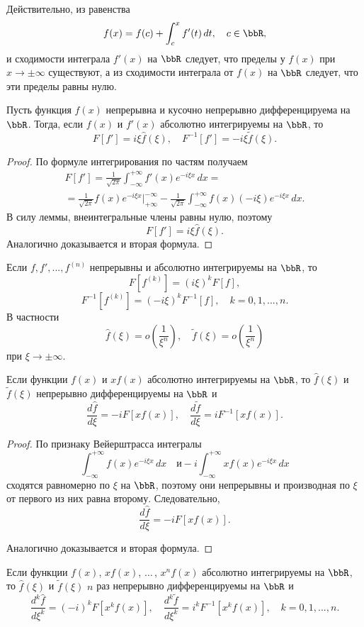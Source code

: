 Действительно, из равенства
$$
f(x)=f(c)+\int_c^x f'(t)\,dt,\quad c\in\bbR,
$$
и сходимости интеграла $f'(x)$ на $\bbR$ следует, что пределы у $f(x)$ при $x\to\pm\infty$ существуют, а из сходимости интеграла от $f(x)$ на $\bbR$ следует, что эти пределы равны нулю.

\begin{thm}
Пусть функция $f(x)$ непрерывна и кусочно непрерывно дифференцируема на $\bbR$. Тогда, если $f(x)$ и $f'(x)$ абсолютно интегрируемы на $\bbR$, то
$$
F[f']=i\xi\widehat{f}(\xi),\quad F^{-1}[f']=-i\xi \widetilde{f}(\xi).
$$
\end{thm}

\begin{proof}
По формуле интегрирования по частям получаем
\begin{multline*}
F[f']=\frac{1}{\sqrt{2\pi}}\int_{-\infty}^{+\infty} f'(x)e^{-i\xi x}\,dx=\\
={\frac{1}{\sqrt{2\pi}}f(x)e^{-i\xi x}}	
\bigg|^{-\infty}_{+\infty} - \frac{1}{\sqrt{2\pi}}\int_{-\infty}^{+\infty}f(x)(-i\xi)e^{-i\xi x}\,dx.
\end{multline*}
В силу леммы, внеинтегральные члены равны нулю, поэтому
$$
F[f']=i\xi\widehat{f}(\xi).
$$
Аналогично доказывается и вторая формула.
\end{proof}

\begin{cons}
Если $f,f',...,f^{(n)}$ непрерывны и абсолютно интегрируемы на $\bbR$, то
$$
F[f^{(k)}]=(i\xi)^kF[f],
$$
$$
F^{-1}[f^{(k)}]=(-i\xi)^kF^{-1}[f], \quad k=0,1,...,n.
$$
В частности
$$
\widehat{f}(\xi)=o\left(\frac{1}{\xi^n}\right),\quad \widetilde{f}(\xi)=o\left(\frac{1}{\xi^n}\right)
$$
при $\xi\to\pm\infty$.
\end{cons}

\begin{thm}
Если функции $f(x)$ и  $xf(x)$ абсолютно интегрируемы на $\bbR$, то $\widehat{f}(\xi)$ и $\widetilde{f}(\xi)$ непрерывно дифференцируемы на $\bbR$ и 
$$
\frac{d\widehat{f}}{d\xi}=-iF[xf(x)],\quad \frac{d\widetilde{f}}{d\xi}=iF^{-1}[xf(x)].
$$
\end{thm}

\begin{proof}
По признаку Вейерштрасса интегралы
$$
\int_{-\infty}^{+\infty}f(x)e^{-i\xi x}\,dx\quad \text{и} -i\int_{-\infty}^{+\infty}xf(x)e^{-i\xi x}\,dx
$$
сходятся равномерно по $\xi$ на $\bbR$, поэтому они непрерывны и производная по $\xi$ от первого из них равна второму. Следовательно,
$$
\frac{d\widehat{f}}{d\xi}=-iF[xf(x)].
$$

Аналогично доказывается и вторая формула.
\end{proof}

\begin{cons}
Если функции $f(x)$, $xf(x)$, $\dots\,$, $x^nf(x)$ абсолютно интегрируемы на $\bbR$, то $\widehat{f}(\xi)$ и $\widetilde{f}(\xi)$ $n$ раз непрерывно дифференцируемы на $\bbR$ и 
$$
\frac{d^k\widehat{f}}{d\xi^k}=(-i)^kF[x^kf(x)],\quad \frac{d^k\widetilde{f}}{d\xi^k} = i^kF^{-1}[x^kf(x)],\quad k=0,1,...,n.
$$
\end{cons}